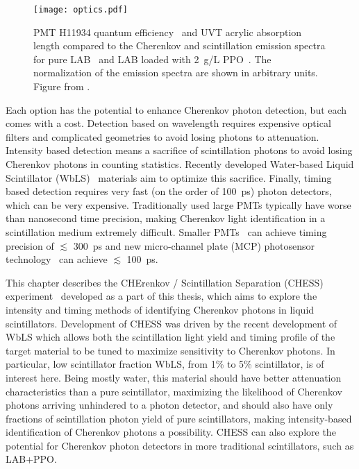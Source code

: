\begin{figure}
	\centering
	\texttt{[image: optics.pdf]}
	\caption{\label{fig:optics} PMT H11934 quantum efficiency~\cite{h11934} and UVT acrylic absorption length compared to the Cherenkov and scintillation emission spectra for pure LAB~\cite{lab_emission} and LAB loaded with 2~g/L PPO~\cite{snop_private}. The normalization of the emission spectra are shown in arbitrary units. Figure from \cite{chess_nim}.}
\end{figure}

Each option has the potential to enhance Cherenkov photon detection, but each comes with a cost.
Detection based on wavelength requires expensive optical filters and complicated geometries to avoid losing photons to attenuation.
Intensity based detection means a sacrifice of scintillation photons to avoid losing Cherenkov photons in counting statistics.
Recently developed Water-based Liquid Scintillator (WbLS)~\cite{wbls} materials aim to optimize this sacrifice.
Finally, timing based detection requires very fast (on the order of 100~ps) photon detectors, which can be very expensive.
Traditionally used large PMTs typically have worse than nanosecond time precision, making Cherenkov light identification in a scintillation medium extremely difficult. 
Smaller PMTs~\cite{h11934} can achieve timing precision of $\lesssim$ 300~ps and new micro-channel plate (MCP) photosensor technology~\cite{mcp, lappd, lappd2} can achieve  $\lesssim$ 100~ps.


This chapter describes the CHErenkov / Scintillation Separation (CHESS) experiment~\cite{chess_nim} developed as a part of this thesis, which aims to explore the intensity and timing methods of identifying Cherenkov photons in liquid scintillators. 
Development of CHESS was driven by the recent development of WbLS which allows both the scintillation light yield and timing profile of the target material to be tuned to maximize sensitivity to Cherenkov photons.  
In particular, low scintillator fraction WbLS, from 1\% to 5\% scintillator, is of interest here. 
Being mostly water, this material should have better attenuation characteristics than a pure scintillator, maximizing the likelihood of Cherenkov photons arriving unhindered to a photon detector, and should also have only fractions of scintillation photon yield of pure scintillators, making intensity-based identification of Cherenkov photons a possibility.
CHESS can also explore the potential for Cherenkov photon detectors in more traditional scintillators, such as LAB+PPO.

